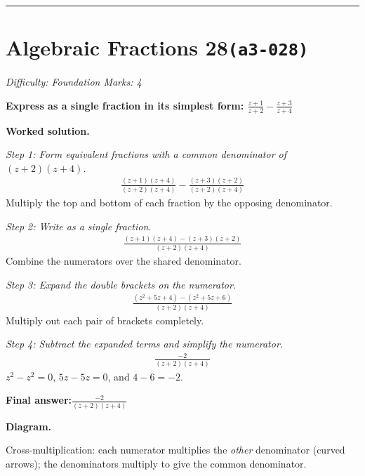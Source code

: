 \documentclass[11pt]{article}
\newcommand{\question}[1]{\par\medskip\noindent\textbf{#1}\par}
\begin{document}
\medskip\hrule

\section*{Algebraic Fractions 28\quad\small\texttt{(a3-028)}}
\textit{Difficulty: Foundation \quad\textbar\quad Marks: 4}

\question{Express as a single fraction in its simplest form: \( \frac{z+1}{z+2} - \frac{z+3}{z+4} \)}

\textbf{Worked solution.}

\textit{Step 1: Form equivalent fractions with a common denominator of \( (z+2)(z+4) \).}
\[\begin{gathered}
\frac{(z+1)(z+4)}{(z+2)(z+4)} - \frac{(z+3)(z+2)}{(z+2)(z+4)}
\end{gathered}\]
Multiply the top and bottom of each fraction by the opposing denominator.

\textit{Step 2: Write as a single fraction.}
\[\begin{gathered}
\frac{(z+1)(z+4) - (z+3)(z+2)}{(z+2)(z+4)}
\end{gathered}\]
Combine the numerators over the shared denominator.

\textit{Step 3: Expand the double brackets on the numerator.}
\[\begin{gathered}
\frac{(z^2 + 5z + 4) - (z^2 + 5z + 6)}{(z+2)(z+4)}
\end{gathered}\]
Multiply out each pair of brackets completely.

\textit{Step 4: Subtract the expanded terms and simplify the numerator.}
\[\begin{gathered}
\frac{-2}{(z+2)(z+4)}
\end{gathered}\]
\( z^2 - z^2 = 0 \), \( 5z - 5z = 0 \), and \( 4 - 6 = -2 \).

\begin{answerbox}
\textbf{Final answer:}\quad \(\displaystyle \frac{-2}{(z+2)(z+4)}\)
\end{answerbox}
\textbf{Diagram.}

\begin{center}
\end{center}
\small Cross-multiplication: each numerator multiplies the \emph{other} denominator (curved arrows); the denominators multiply to give the common denominator.\normalsize
\end{document}
